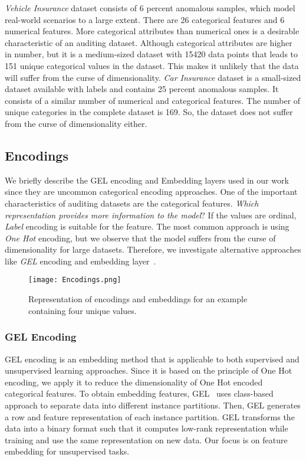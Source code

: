 \documentclass{article}
\begin{document}
\textit{Vehicle Insurance} dataset consists of 6 percent anomalous samples, which model real-world scenarios to a large extent. There are 26 categorical features and 6 numerical features. More categorical attributes than numerical ones is a desirable characteristic of an auditing dataset. Although categorical attributes are higher in number, but it is a medium-sized dataset with 15420 data points that leads to 151 unique categorical values in the dataset. This makes it unlikely that the data will suffer from the curse of dimensionality. \textit{Car Insurance} dataset is a small-sized dataset available with labels and contains 25 percent anomalous samples. It consists of a similar number of numerical and categorical features. The number of unique categories in the complete dataset is 169. So, the dataset does not suffer from the curse of dimensionality either.

\subsection{Encodings}\label{a2}

We briefly describe the GEL encoding and Embedding layers used in our work since they are uncommon categorical encoding approaches. One of the important characteristics of auditing datasets are the categorical features. \textit{Which representation provides more information to the model}? If the values are ordinal, \textit{Label} encoding is suitable for the feature. The most common approach is using \textit{One Hot} encoding, but we observe that the model suffers from the curse of dimensionality for large datasets. Therefore, we investigate alternative approaches like \textit{GEL} encoding and embedding layer~\citep{entityembed}.

\begin{figure}[htbp]
  \centering
    \texttt{[image: Encodings.png]}
    \caption{Representation of encodings and embeddings for an example containing four unique values.}
    \label{fig:a1}
\end{figure}




\subsubsection{GEL Encoding}

GEL encoding is an embedding method that is applicable to both supervised and unsupervised learning approaches. Since it is based on the principle of One Hot encoding, we apply it to reduce the dimensionality of One Hot encoded categorical features. To obtain embedding features, GEL~\citep{gel} uses class-based approach to separate data into different instance partitions. Then, GEL generates a row and feature representation of each instance partition. GEL transforms the data into a binary format such that it computes  low-rank representation while training and use the same representation on new data. Our focus is on feature embedding for unsupervised tasks.
\end{document}
